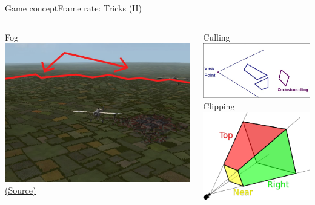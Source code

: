 \documentclass[10pt,compress]{beamer} %
\begin{document}
\begin{frame}{Game concept}{Frame rate: Tricks (II)}
    \begin{columns}
	   \smallskip
		\begin{center}
	        Fog\\
		    \includegraphics[width=0.8\linewidth]{figs/fog}\\
			\tiny\href{http://combatace.com/topic/50040-greatly-reduce-the-ugly-horizon-band/}{(Source)}
		\end{center}

		\begin{center}
	   		Culling\\
		    \includegraphics[width=0.7\linewidth]{figs/culling}\\
			\smallskip
	   		Clipping\\
		    \includegraphics[width=0.7\linewidth]{figs/clipping}\\
			\bigskip
		\end{center}
    \end{columns}
\end{frame}
\end{document}
